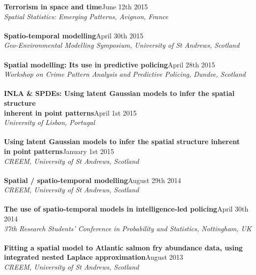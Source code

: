 \documentclass[10pt,letter]{article}
\begin{document}
{\textbf{Terrorism in space and time}}\hfill June 12th 2015\\
 {\sl Spatial Statistics: Emerging Patterns, Avignon, France}\\
 \hdashrule[0.5ex]{4cm}{1pt}{1pt}\\
 {\textbf{Spatio-temporal modelling}}\hfill April 30th 2015\\
 {\sl Geo-Environmental Modelling Symposium, University of St Andrews, Scotland}\\
 \hdashrule[0.5ex]{4cm}{1pt}{1pt}\\
 \noindent
{\textbf{Spatial modelling: Its use in predictive policing}}\hfill April 28th 2015\\
{\sl Workshop on Crime Pattern Analysis and Predictive Policing, Dundee, Scotland}\\
\hdashrule[0.5ex]{4cm}{1pt}{1pt}\\
{\textbf{INLA \& SPDEs: Using latent Gaussian models to infer the spatial structure \\
inherent in point patterns}}\hfill April 1st 2015\\
 {\sl University of Lisbon, Portugal}\\
 \hdashrule[0.5ex]{4cm}{1pt}{1pt}\\
 {\textbf{Using latent Gaussian models to infer the spatial
structure inherent \\in point patterns}}\hfill January 1st 2015\\
 {\sl CREEM, University of St Andrews, Scotland}\\
 \hdashrule[0.5ex]{4cm}{1pt}{1pt}\\
 {\textbf{Spatial / spatio-temporal modelling}}\hfill August 29th 2014\\
 {\sl CREEM, University of St Andrews, Scotland}\\
 \hdashrule[0.5ex]{4cm}{1pt}{1pt}\\
{\textbf{The use of spatio-temporal models in intelligence-led policing}}\hfill  April 30th 2014\\
 {\sl 37th Research Students' Conference in Probability and Statistics, Nottingham, UK}\\
 \hdashrule[0.5ex]{4cm}{1pt}{1pt}\\
{\textbf{Fitting a spatial model to Atlantic salmon fry abundance data, using\\ integrated nested Laplace approximation}}\hfill  August 2013\\
 {\sl CREEM, University of St Andrews, Scotland}\\ 
 \vspace{-1mm}
\newpage
\end{document}
